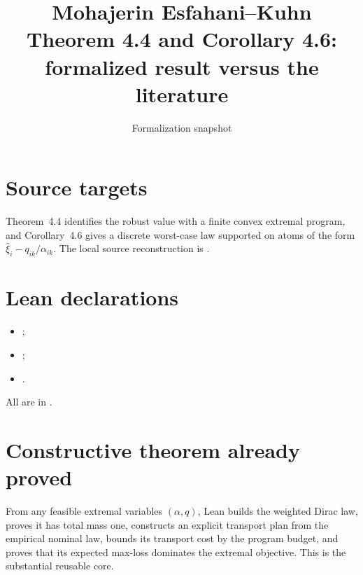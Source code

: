 \title{Mohajerin Esfahani--Kuhn Theorem 4.4 and Corollary 4.6: formalized result versus the literature}
\author{}
\date{Formalization snapshot \snapshot}

\maketitle
{}
\section{Source targets}
Theorem~4.4 identifies the robust value with a finite convex extremal program, and Corollary~4.6 gives a discrete worst-case law supported on atoms of the form
$\widehat\xi_i-q_{ik}/\alpha_{ik}$.  The local source reconstruction is
.

\section{Lean declarations}
\begin{itemize}[leftmargin=2em]
\item {};
\item {};
\item {}.
\end{itemize}
All are in .

\section{Constructive theorem already proved}
From any feasible extremal variables $(\alpha,q)$, Lean builds the weighted Dirac law, proves it has total mass one, constructs an explicit transport plan from the empirical nominal law, bounds its transport cost by the program budget, and proves that its expected max-loss dominates the extremal objective.  This is the substantial reusable core.

